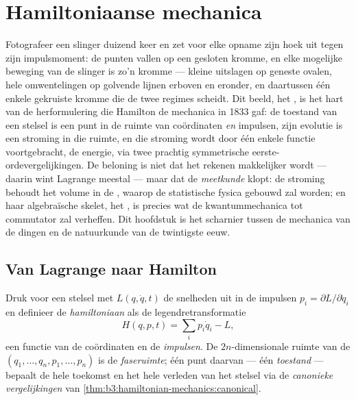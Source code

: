 \chapter{Hamiltoniaanse mechanica}\label{ch:b3:hamiltonian-mechanics}

Fotografeer een slinger duizend keer en zet voor elke opname zijn hoek
uit tegen zijn impulsmoment: de punten vallen op een gesloten kromme, en
elke mogelijke beweging van de slinger is zo'n kromme --- kleine
uitslagen op geneste ovalen, hele omwentelingen op golvende lijnen erboven
en eronder, en daartussen één enkele gekruiste kromme die de twee regimes
scheidt. Dit beeld, het \emph{}, is het hart van de
herformulering die Hamilton de mechanica in 1833 gaf: de toestand van een
stelsel is een punt in de ruimte van coördinaten \emph{en} impulsen, zijn
evolutie is een stroming in die ruimte, en die stroming wordt door één
enkele functie voortgebracht, de energie, via twee prachtig symmetrische
eerste-ordevergelijkingen. De beloning is niet dat het rekenen makkelijker
wordt --- daarin wint Lagrange meestal --- maar dat de \emph{meetkunde}
klopt: de stroming behoudt het volume in de , waarop de
statistische fysica gebouwd zal worden; en haar algebraïsche skelet, het
, is precies wat de kwantummechanica tot commutator zal
verheffen. Dit hoofdstuk is het scharnier tussen de mechanica van de
dingen en de natuurkunde van de twintigste eeuw.

\section{Van Lagrange naar Hamilton}

\begin{definition}\label{def:b3:hamiltonian-mechanics:hamiltonian}
Druk voor een stelsel met  $L(q, \dot q, t)$ de snelheden uit
in de impulsen $p_i = \partial L/\partial\dot q_i$ en definieer de
\emph{hamiltoniaan} als de legendretransformatie
\[
H(q, p, t) = \sum_i p_i\dot q_i - L ,
\]
een functie van de coördinaten en de \emph{impulsen}. De
$2n$-dimensionale ruimte van de $(q_1, \dots, q_n, p_1, \dots, p_n)$ is
de \emph{faseruimte}; één punt daarvan --- één \emph{toestand} ---
bepaalt de hele toekomst en het hele verleden van het stelsel via de
\emph{canonieke vergelijkingen} van
\cref{thm:b3:hamiltonian-mechanics:canonical}.
\end{definition}

